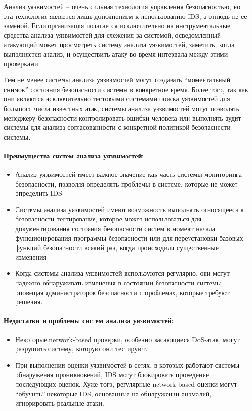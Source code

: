 Анализ уязвимостей -- очень сильная технология управления безопасностью, но эта технология является лишь дополнением к использованию IDS, а отнюдь не ее заменой. Если организация полагается исключительно на инструментальные средства анализа уязвимостей для слежения за системой, осведомленный атакующий может просмотреть систему анализа уязвимостей, заметить, когда выполняется анализ, и осуществить атаку во время интервала между этими проверками. 

Тем не менее системы анализа уязвимостей могут создавать ``моментальный снимок'' состояния безопасности системы в конкретное время. Более того, так как они являются исключительно тестовыми системами поиска уязвимостей для большого числа известных атак, системы анализа уязвимостей могут позволять менеджеру безопасности контролировать ошибки человека или выполнять аудит системы для анализа согласованности с конкретной политикой безопасности системы.

\paragraph*{Преимущества систем анализа уязвимостей:}

\begin{itemize}
	\item Анализ уязвимостей имеет важное значение как часть системы мониторинга безопасности, позволяя определять проблемы в системе, которые не может определить IDS.

	\item Системы анализа уязвимостей имеют возможность выполнять относящееся к безопасности тестирование, которое может использоваться для документирования состояния безопасности систем в момент начала функционирования программы безопасности или для переустановки базовых функций безопасности всякий раз, когда происходили существенные изменения.
	
	\item Когда системы анализа уязвимостей используются регулярно, они могут надежно обнаруживать изменения в состоянии безопасности системы, оповещая администраторов безопасности о проблемах, которые требуют решения.
\end{itemize}


\paragraph*{Недостатки и проблемы систем анализа уязвимостей:}

\begin{itemize}
	\item Некоторые network-based проверки, особенно касающиеся DoS-атак, могут разрушить систему, которую они тестируют.

	\item При выполнении оценки уязвимостей в сетях, в которых работают системы обнаружения проникновений, IDS могут блокировать проведение последующих оценок. Хуже того, регулярные network-based оценки могут ``обучить'' некоторые IDS, основанные на обнаружении аномалий, игнорировать реальные атаки.
\end{itemize}


